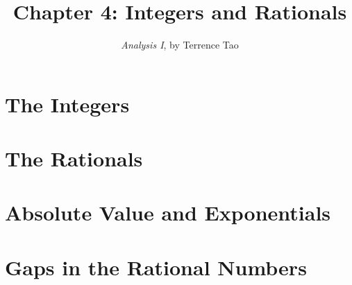 \documentclass{extarticle}
\title{\vspace{-2em}Chapter 4: Integers and Rationals}
\author{\emph{Analysis I}, by Terrence Tao}
\date{}
\begin{document}
\maketitle



\section{The Integers}


\break



\section{The Rationals}

\break


\section{Absolute Value and Exponentials}

\break

\break
\section{Gaps in the Rational Numbers}

\break
\end{document}
